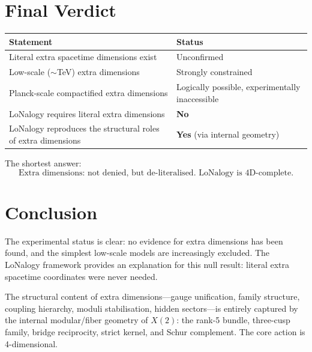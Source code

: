 \documentclass[12pt]{article}
\theoremstyle{plain}
\theoremstyle{definition}
\numberwithin{equation}{section}
\begin{document}
\section{Final Verdict}\label{sec:verdict}

\begin{center}
\begin{tabular}{p{6cm}l}
\toprule
Statement & Status\\
\midrule
Literal extra spacetime dimensions exist
  & Unconfirmed\\
Low-scale ($\sim$TeV) extra dimensions
  & Strongly constrained\\
Planck-scale compactified extra dimensions
  & Logically possible, experimentally
  inaccessible\\
LoNalogy requires literal extra dimensions
  & \textbf{No}\\
LoNalogy reproduces the structural roles of
extra dimensions
  & \textbf{Yes} (via internal geometry)\\
\bottomrule
\end{tabular}
\end{center}

The shortest answer:
\begin{equation}
\boxed{\text{Extra dimensions: not denied, but de-literalised.
LoNalogy is 4D-complete.}}
\end{equation}


\section*{Conclusion}

The experimental status is clear: no evidence for extra dimensions
has been found, and the simplest low-scale models are increasingly
excluded.  The LoNalogy framework provides an explanation for this
null result: literal extra spacetime coordinates were never needed.

The structural content of extra dimensions---gauge unification,
family structure, coupling hierarchy, moduli stabilisation, hidden
sectors---is entirely captured by the internal modular/fiber geometry
of $X(2)$: the rank-5 bundle, three-cusp family, bridge reciprocity,
strict kernel, and Schur complement.  The core action is 4-dimensional.
\end{document}
